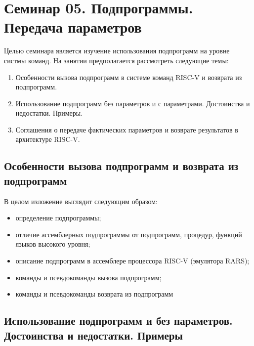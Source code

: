 \chapter[Подпрограммы. Начало]{Семинар 05. Подпрограммы. Передача параметров}

Целью семинара является изучение использования подпрограмм на уровне систмы команд.
На занятии предполагается рассмотреть следующие темы:
\begin{enumerate}
    \item Особенности вызова подпрограмм в системе команд RISC-V и возврата из подпрограмм.
    \item Использование подпрограмм без параметров и с параметрами. Достоинства и недостатки. Примеры.
    \item Соглашения о передаче фактических параметров и возврате результатов в архитектуре RISC-V.
\end{enumerate}

\section{Особенности вызова подпрограмм и возврата из подпрограмм}

В целом изложение выглядит следующим образом:
\begin{itemize}
    \item определение подпрограммы;
    \item отличие ассемблерных подпрограммы от подпрограмм, процедур, функций языков высокого уровня;
    \item описание подпрограмм в ассемблере процессора RISC-V (эмулятора RARS);
    \item команды и псевдокоманды вызова подпрограмм;
    \item команды и псевдокоманды возврата из подпрограмм
\end{itemize}

\section{Использование подпрограмм и без параметров. Достоинства и недостатки. Примеры}

